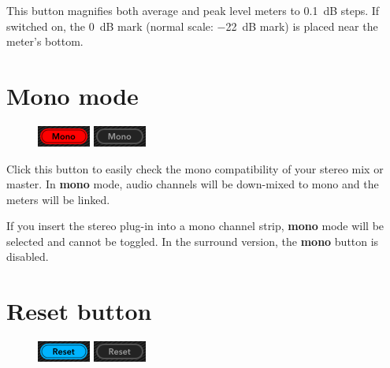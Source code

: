 This button magnifies both average and peak level meters to
\SI{0.1}{\dB} steps.  If switched on, the \SI{0}{\dB} mark (normal
scale: \SI{-22}{\dB} mark) is placed near the meter's bottom.

\newpage %

\section{Mono mode}

\begin{figure}
\includegraphics[scale=\screenshotscale,clip]{include/images/button_mono_on.png}
\newline \vspace{-0.9\baselineskip}
\includegraphics[scale=\screenshotscale,clip]{include/images/button_mono_off.png}
\end{figure}

Click this button to easily check the mono compatibility of your
stereo mix or master.  In \textbf{mono} mode, audio channels will be
down-mixed to mono and the meters will be linked.

If you insert the stereo plug-in into a mono channel strip,
\textbf{mono} mode will be selected and cannot be toggled.  In the
surround version, the \textbf{mono} button is disabled.

\section{Reset button}

\begin{figure}
\includegraphics[scale=\screenshotscale,clip]{include/images/button_reset_on.png}
\newline \vspace{-0.9\baselineskip}
\includegraphics[scale=\screenshotscale,clip]{include/images/button_reset_off.png}
\end{figure}

